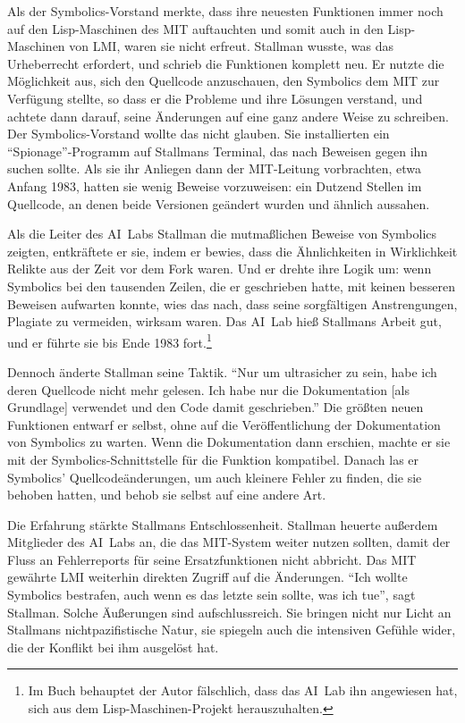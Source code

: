 Als der Symbolics-Vorstand merkte, dass ihre neuesten Funktionen immer noch auf den Lisp-Maschinen des MIT auftauchten und somit auch in den Lisp-Maschinen von LMI, waren sie nicht erfreut. Stallman wusste, was das Urheberrecht erfordert, und schrieb die Funktionen komplett neu. Er nutzte die Möglichkeit aus, sich den Quellcode anzuschauen, den Symbolics dem MIT zur Verfügung stellte, so dass er die Probleme und ihre Lösungen verstand, und achtete dann darauf, seine Änderungen auf eine ganz andere Weise zu schreiben. Der Symbolics-Vorstand wollte das nicht glauben. Sie installierten ein "`Spionage"'-Programm auf Stallmans Terminal, das nach Beweisen gegen ihn suchen sollte. Als sie ihr Anliegen dann der MIT-Leitung vorbrachten, etwa Anfang 1983, hatten sie wenig Beweise vorzuweisen: ein Dutzend Stellen im Quellcode, an denen beide Versionen geändert wurden und ähnlich aussahen.

Als die Leiter des AI~Labs Stallman die mutmaßlichen Beweise von Symbolics zeigten, entkräftete er sie, indem er bewies, dass die Ähnlichkeiten in Wirklichkeit Relikte aus der Zeit vor dem Fork waren. Und er drehte ihre Logik um: wenn Symbolics bei den tausenden Zeilen, die er geschrieben hatte, mit keinen besseren Beweisen aufwarten konnte, wies das nach, dass seine sorgfältigen Anstrengungen, Plagiate zu vermeiden, wirksam waren. Das AI~Lab hieß Stallmans Arbeit gut, und er führte sie bis Ende 1983 fort.\footnote{Im Buch  behauptet der Autor \citeauthor{brainm} fälschlich, dass das AI~Lab ihn angewiesen hat, sich aus dem Lisp-Maschinen-Projekt herauszuhalten.}

Dennoch änderte Stallman seine Taktik. "`Nur um ultrasicher zu sein, habe ich deren Quellcode nicht mehr gelesen. Ich habe nur die Dokumentation [als Grundlage] verwendet und den Code damit geschrieben."'  Die größten neuen Funktionen entwarf er selbst, ohne auf die Veröffentlichung der Dokumentation von Symbolics zu warten. Wenn die Dokumentation dann erschien, machte er sie mit der Symbolics-Schnittstelle für die Funktion kompatibel. Danach las er Symbolics' Quellcodeänderungen, um auch kleinere Fehler zu finden, die sie behoben hatten, und behob sie selbst auf eine andere Art.

Die Erfahrung stärkte Stallmans Entschlossenheit. Stallman heuerte außerdem Mitglieder des AI~Labs an, die das MIT-System weiter nutzen sollten, damit der Fluss an Fehlerreports für seine Ersatzfunktionen nicht abbricht. Das MIT gewährte LMI weiterhin direkten Zugriff auf die Änderungen. "`Ich wollte Symbolics bestrafen, auch wenn es das letzte sein sollte, was ich tue"', sagt Stallman. Solche Äußerungen sind aufschlussreich. Sie bringen nicht nur Licht an Stallmans nichtpazifistische Natur, sie spiegeln auch die intensiven Gefühle wider, die der Konflikt bei ihm ausgelöst hat.

